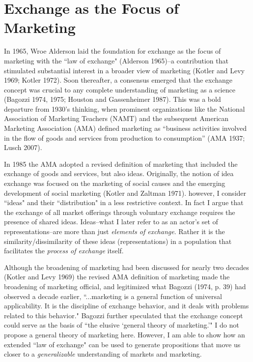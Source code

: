 \section{Exchange as the Focus of Marketing}
In 1965, Wroe Alderson laid the foundation for exchange as the focus of marketing with the ``law of exchange"  (Alderson 1965)--a contribution that stimulated substantial interest in a broader view of marketing (Kotler and Levy 1969; Kotler 1972).  Soon thereafter, a consensus emerged that the exchange concept was crucial to any complete understanding of marketing as a science (Bagozzi 1974, 1975; Houston and Gassenheimer 1987). This was a bold departure from 1930's thinking, when prominent organizations like the National Association of Marketing Teachers (NAMT) and the subsequent American Marketing Association (AMA) defined marketing as ``business activities involved in the flow of goods and services from production to consumption'' (AMA 1937; Lusch 2007). 

In 1985 the AMA adopted a revised definition of marketing that included the exchange of goods and services, but also ideas. Originally, the notion of idea exchange was focused on the marketing of social causes and the emerging development of social marketing (Kotler and Zaltman 1971). however, I consider ``ideas" and their ``distribution" in a less restrictive context. In fact I argue that the exchange of all market offerings through voluntary exchange requires the presence of shared ideas. Ideas--what I later refer to as an actor's set of representations--are more than just \emph{elements of exchange}. Rather it is the similarity/dissimilarity of these ideas (representations) in a population that facilitates the \emph{process of exchange} itself. 

Although the broadening of marketing had been discussed for nearly two decades (Kotler and Levy 1969) the revised AMA definition of marketing made the broadening of marketing official, and legitimized what Bagozzi (1974, p. 39) had observed a decade earlier,  ``...marketing is a general function of universal applicability. It is the discipline of exchange behavior, and it deals with problems related to this behavior." Bagozzi further speculated that the exchange concept could serve as the basis of ``the elusive `general theory of marketing.'" I do not propose a general theory of marketing here. However, I am able to show how an extended ``law of exchange" can be used to generate propositions that move us closer to a \emph{generalizable} understanding of markets and marketing. 

